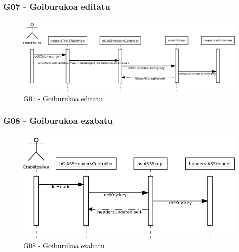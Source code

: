 \subsubsection{G07 - Goiburukoa editatu}
\begin{figure}[htp]
\begin{center}
\includegraphics[scale=0.33]{Pictures/Chapter4/Diseinua/G07.png}
\caption{G07 - Goiburukoa editatu}
\label{g07d}
\end{center}
\end{figure}

\newpage
\subsubsection{G08 - Goiburukoa ezabatu}
\begin{figure}[htp]
\begin{center}
\includegraphics[scale=0.4]{Pictures/Chapter4/Diseinua/G08.png}
\caption{G08 - Goiburukoa ezabatu}
\label{g08d}
\end{center}
\end{figure}


